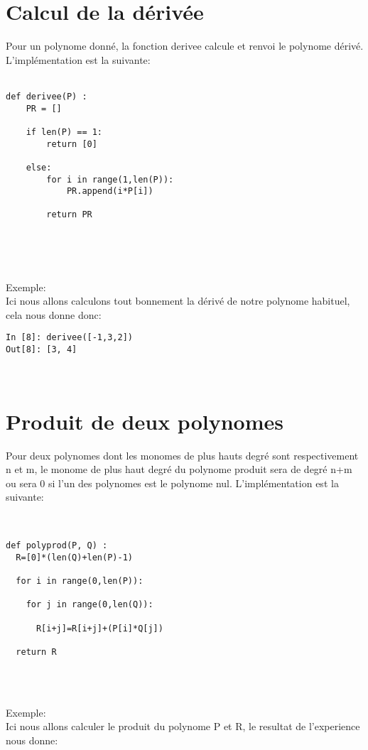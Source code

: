 \documentclass{exam}
\newenvironment{DDbox}[1]{
\begin{lrbox}{\BBbox}\begin{minipage}{\linewidth}}
{\end{minipage}\end{lrbox}\noindent\colorbox{Zgris}{\usebox{\BBbox}} \\
[.5cm]}
\begin{document}
\section{Calcul de la dérivée}
 Pour un polynome donné, la fonction derivee calcule et renvoi le polynome dérivé. L'implémentation est la suivante:\\\\
\begin{DDbox}{\linewidth}
\begin{Verbatim}
def derivee(P) :
	PR = []
	
	if len(P) == 1:
		return [0]
		
	else:
		for i in range(1,len(P)):
			PR.append(i*P[i])
			
		return PR


	 
\end{Verbatim}
\end{DDbox}
Exemple:\\ Ici nous allons calculons tout bonnement la dérivé de notre polynome habituel, cela nous donne donc:\\
\begin{DDbox}{\linewidth}
\begin{Verbatim}
In [8]: derivee([-1,3,2])
Out[8]: [3, 4]

\end{Verbatim}
\end{DDbox}

\section{Produit de deux polynomes}
Pour deux polynomes dont les monomes de plus hauts degré sont respectivement n et m, le monome de plus haut degré du polynome produit sera de degré n+m ou sera 0 si l'un des polynomes est le polynome nul. L'implémentation est la suivante:\\\\

\begin{DDbox}{\linewidth}
\begin{Verbatim}

def polyprod(P, Q) :
  R=[0]*(len(Q)+len(P)-1)

  for i in range(0,len(P)):

    for j in range(0,len(Q)):

      R[i+j]=R[i+j]+(P[i]*Q[j])  
 
  return R

	 
\end{Verbatim}
\end{DDbox}
Exemple:\\ Ici nous allons calculer le produit du polynome P et R, le resultat de l'experience nous donne:\\
\end{document}
